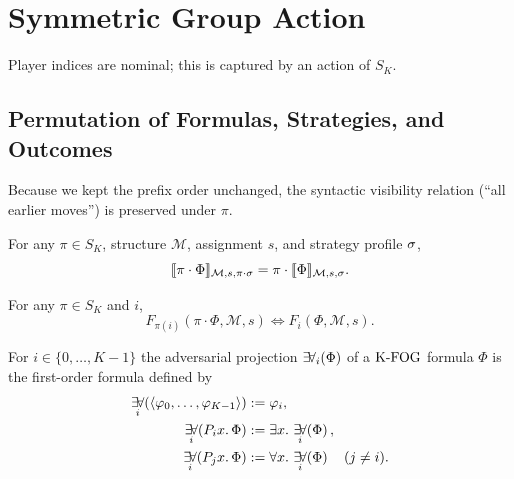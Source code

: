 \section{Symmetric Group Action}
\label{sec:symmetry}

Player indices are nominal; this is captured by an action of $S_K$.

\subsection{Permutation of Formulas, Strategies, and Outcomes}


Because we kept the prefix order unchanged, the syntactic visibility relation (``all earlier moves'') is preserved under $\pi$.

\begin{theorem}\label{thm:k-equivariance}
For any $\pi \in S_K$, structure $\mathcal M$, assignment $s$, and strategy profile $\sigma$,
\[
\llbracket \pi \cdot \Phi \rrbracket_{\mathcal M, s, \pi \cdot \sigma}
= \pi \cdot \llbracket \Phi \rrbracket_{\mathcal M, s, \sigma}.
\]
\end{theorem}

\begin{corollary}\label{cor:k-force-equiv}
For any $\pi \in S_K$ and $i$,
\[
F_{\pi(i)}(\pi \cdot \Phi, \mathcal M, s)
\iff
F_i(\Phi, \mathcal M, s).
\]
\end{corollary}

\begin{definition}
For $i \in \{0,\dots,K-1\}$ the adversarial projection
$\mathop{\exists\!\forall}_{i}\!\left(\Phi\right)$ of a $\mathrm{K\text{-}FOG}$ formula $\Phi$ is the first-order
formula defined by
\[
\begin{aligned}
\AdvProj{i}{\langle \fo_0,\dots,\fo_{K-1}\rangle}
  &:= \fo_i,\\
\AdvProj{i}{P_i x.\,\Phi}
  &:= \exists x.\,\AdvProj{i}{\Phi},\\
\AdvProj{i}{P_j x.\,\Phi}
  &:= \forall x.\,\AdvProj{i}{\Phi} \quad (j \ne i).
\end{aligned}
\]
\end{definition}

